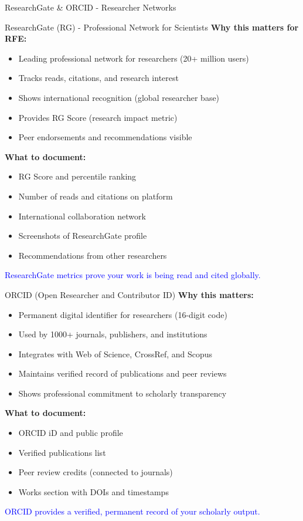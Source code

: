 \documentclass[11pt]{beamer}
\begin{document}
	\begin{frame}{ResearchGate \& ORCID - Researcher Networks}
		\scriptsize
		\begin{block}{ResearchGate (RG) - Professional Network for Scientists}
			\textbf{Why this matters for RFE:}
			\begin{itemize}
				\item Leading professional network for researchers (20+ million users)
				\item Tracks reads, citations, and research interest
				\item Shows international recognition (global researcher base)
				\item Provides RG Score (research impact metric)
				\item Peer endorsements and recommendations visible
			\end{itemize}
			\textbf{What to document:}
			\begin{itemize}
				\item RG Score and percentile ranking
				\item Number of reads and citations on platform
				\item International collaboration network
				\item Screenshots of ResearchGate profile
				\item Recommendations from other researchers
			\end{itemize}
			\textcolor{blue}{ResearchGate metrics prove your work is being read and cited globally.}
		\end{block}
		
		\begin{block}{ORCID (Open Researcher and Contributor ID)}
			\textbf{Why this matters:}
			\begin{itemize}
				\item Permanent digital identifier for researchers (16-digit code)
				\item Used by 1000+ journals, publishers, and institutions
				\item Integrates with Web of Science, CrossRef, and Scopus
				\item Maintains verified record of publications and peer reviews
				\item Shows professional commitment to scholarly transparency
			\end{itemize}
			\textbf{What to document:}
			\begin{itemize}
				\item ORCID iD and public profile
				\item Verified publications list
				\item Peer review credits (connected to journals)
				\item Works section with DOIs and timestamps
			\end{itemize}
			\textcolor{blue}{ORCID provides a verified, permanent record of your scholarly output.}
		\end{block}
	\end{frame}
	
\end{document}
